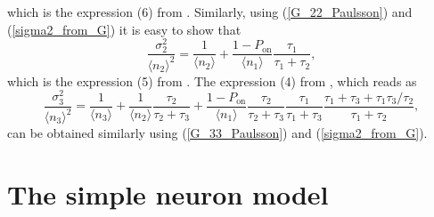 \documentclass[a4paper, 11pt]{article}
\begin{document}
which is the expression (6) from \cite{PAULSSON2005157}. Similarly, using (\ref{G_22_Paulsson}) and (\ref{sigma2_from_G}) it is easy to show that
\begin{equation*}
  \frac{\sigma_2^2}{\langle n_2\rangle^2} = \frac{1}{\langle n_2\rangle} + \frac{1-P_{\text{on}}}{\langle n_1\rangle}\frac{\tau_1}{\tau_1+\tau_2},
\end{equation*}
which is the expression (5) from \cite{PAULSSON2005157}. The expression (4) from \cite{PAULSSON2005157}, which reads as
\begin{equation*}
  \frac{\sigma_3^2}{\langle n_3\rangle^2} = \frac{1}{\langle n_3\rangle} + \frac{1}{\langle n_2\rangle}\frac{\tau_2}{\tau_2+\tau_3} + \frac{1-P_{\text{on}}}{\langle n_1\rangle}\frac{\tau_2}{\tau_2+\tau_3}\frac{\tau_1}{\tau_1+\tau_3}\frac{\tau_1+\tau_3+\tau_1\tau_3/\tau_2}{\tau_1+\tau_2},
\end{equation*}
can be obtained similarly using (\ref{G_33_Paulsson}) and (\ref{sigma2_from_G}).

\section{The simple neuron model}
\end{document}
